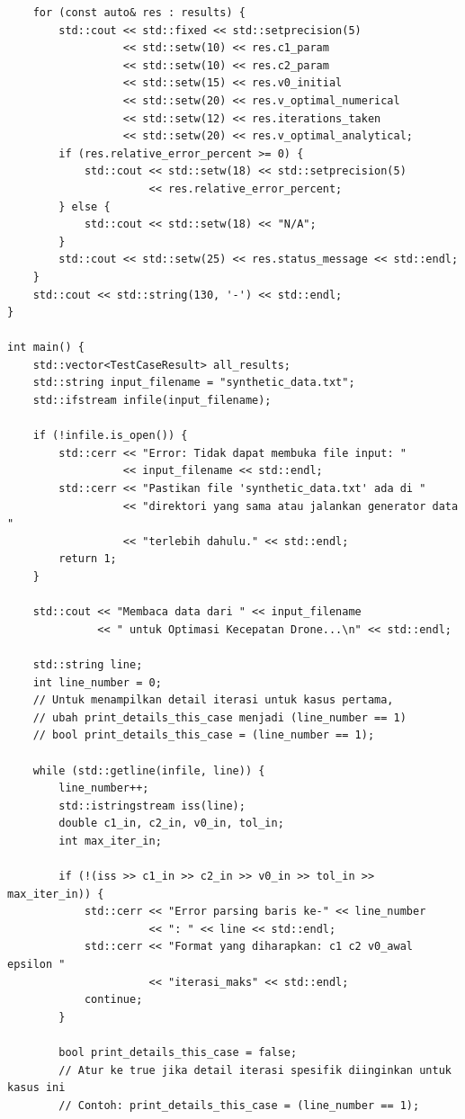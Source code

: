 \documentclass[conference]{IEEEtran}
\begin{document}
\begin{verbatim}
    for (const auto& res : results) {
        std::cout << std::fixed << std::setprecision(5)
                  << std::setw(10) << res.c1_param
                  << std::setw(10) << res.c2_param
                  << std::setw(15) << res.v0_initial
                  << std::setw(20) << res.v_optimal_numerical
                  << std::setw(12) << res.iterations_taken
                  << std::setw(20) << res.v_optimal_analytical;
        if (res.relative_error_percent >= 0) {
            std::cout << std::setw(18) << std::setprecision(5) 
                      << res.relative_error_percent;
        } else {
            std::cout << std::setw(18) << "N/A"; 
        }
        std::cout << std::setw(25) << res.status_message << std::endl;
    }
    std::cout << std::string(130, '-') << std::endl;
}

int main() {
    std::vector<TestCaseResult> all_results;
    std::string input_filename = "synthetic_data.txt";
    std::ifstream infile(input_filename);

    if (!infile.is_open()) {
        std::cerr << "Error: Tidak dapat membuka file input: " 
                  << input_filename << std::endl;
        std::cerr << "Pastikan file 'synthetic_data.txt' ada di "
                  << "direktori yang sama atau jalankan generator data "
                  << "terlebih dahulu." << std::endl;
        return 1;
    }

    std::cout << "Membaca data dari " << input_filename 
              << " untuk Optimasi Kecepatan Drone...\n" << std::endl;

    std::string line;
    int line_number = 0;
    // Untuk menampilkan detail iterasi untuk kasus pertama, 
    // ubah print_details_this_case menjadi (line_number == 1)
    // bool print_details_this_case = (line_number == 1);

    while (std::getline(infile, line)) {
        line_number++;
        std::istringstream iss(line);
        double c1_in, c2_in, v0_in, tol_in;
        int max_iter_in;

        if (!(iss >> c1_in >> c2_in >> v0_in >> tol_in >> max_iter_in)) {
            std::cerr << "Error parsing baris ke-" << line_number 
                      << ": " << line << std::endl;
            std::cerr << "Format yang diharapkan: c1 c2 v0_awal epsilon "
                      << "iterasi_maks" << std::endl;
            continue; 
        }
        
        bool print_details_this_case = false; 
        // Atur ke true jika detail iterasi spesifik diinginkan untuk kasus ini
        // Contoh: print_details_this_case = (line_number == 1); 


\end{verbatim}
\end{document}
